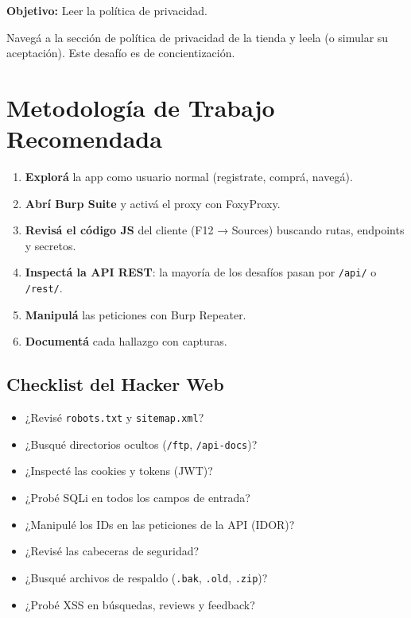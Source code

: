 \documentclass[11pt,a4paper]{article}
\begin{document}
\begin{desafio}
\textbf{Objetivo:} Leer la política de privacidad.
\begin{solucion}
Navegá a la sección de política de privacidad de la tienda y leela (o simular su aceptación). Este desafío es de concientización.
\end{solucion}
\end{desafio}

\section{Metodología de Trabajo Recomendada}

\begin{clave}
\begin{enumerate}[leftmargin=*]
  \item \textbf{Explorá} la app como usuario normal (registrate, comprá, navegá).
  \item \textbf{Abrí Burp Suite} y activá el proxy con FoxyProxy.
  \item \textbf{Revisá el código JS} del cliente (F12 → Sources) buscando rutas, endpoints y secretos.
  \item \textbf{Inspectá la API REST}: la mayoría de los desafíos pasan por \texttt{/api/} o \texttt{/rest/}.
  \item \textbf{Manipulá} las peticiones con Burp Repeater.
  \item \textbf{Documentá} cada hallazgo con capturas.
\end{enumerate}
\end{clave}

\subsection{Checklist del Hacker Web}
\begin{itemize}[leftmargin=*]
  \item ¿Revisé \texttt{robots.txt} y \texttt{sitemap.xml}?
  \item ¿Busqué directorios ocultos (\texttt{/ftp}, \texttt{/api-docs})?
  \item ¿Inspecté las cookies y tokens (JWT)?
  \item ¿Probé SQLi en todos los campos de entrada?
  \item ¿Manipulé los IDs en las peticiones de la API (IDOR)?
  \item ¿Revisé las cabeceras de seguridad?
  \item ¿Busqué archivos de respaldo (\texttt{.bak}, \texttt{.old}, \texttt{.zip})?
  \item ¿Probé XSS en búsquedas, reviews y feedback?
\end{itemize}
\end{document}

